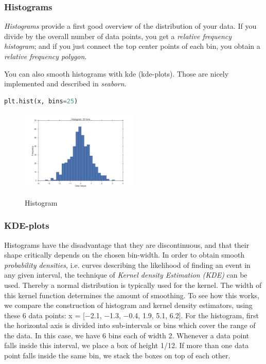 \subsubsection{Histograms}


\emph{Histograms} provide a first good overview of the distribution of your data.
If you divide by the overall number of data points, you get a \emph{relative frequency
histogram}; and if you just connect the top center points of each bin, you obtain a
\emph{relative frequency polygon}.

You can also smooth histograms with \acrfull{kde} (kde-plots). Those are nicely implemented and described in \emph{seaborn}.

\begin{lstlisting}[language=Python]
    plt.hist(x, bins=25)
\end{lstlisting}

\begin{figure}[H]
  \centering
  \includegraphics[width=0.5\textwidth]{../Images/Histogram.png}\\
  \caption{Histogram}
\end{figure}

\subsubsection{KDE-plots}

Histograms have the disadvantage that they are discontinuous, and that their shape critically depends on the chosen bin-width. In order to obtain smooth \emph{probability densities}, i.e. curves describing the likelihood of finding an event in any given interval, the technique of \emph{Kernel \gls{density} Estimation (KDE)} can be used. Thereby a normal distribution is typically used for the kernel. The width of this kernel function determines the amount of smoothing. To see how this works, we compare the construction of histogram and kernel density estimators, using these 6 data points: x = [−2.1, −1.3, −0.4, 1.9, 5.1, 6.2]. For the histogram, first the horizontal axis is divided into sub-intervals or bins which cover the range of the data. In this case, we have 6 bins each of width 2. Whenever a data point falls inside this interval, we place a box of height 1/12. If more than one data point falls inside the same bin, we stack the boxes on top of each other.

